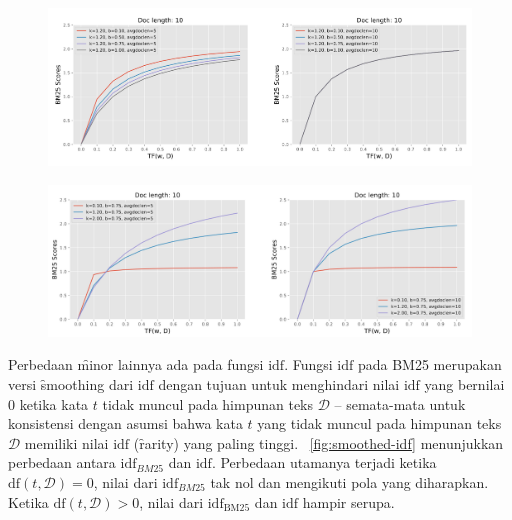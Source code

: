     \begin{figure}[!ht]
        \centering
        \includegraphics[width=1\textwidth]{assets/pics/effect-bm25-param-b.png}
        \label{fig:effect-bm25-param-b}
    \end{figure}
    \begin{figure}[!ht]
        \centering
        \includegraphics[width=1\textwidth]{assets/pics/effect-bm25-param-k.png}
        \label{fig:effect-bm25-param-k}
    \end{figure}
    
    Perbedaan \f{minor} lainnya ada pada fungsi $\text{idf}$. Fungsi $\text{idf}$ pada BM25 merupakan versi \f{smoothing} dari $\text{idf}$ dengan tujuan untuk menghindari nilai $\text{idf}$ yang bernilai 0 ketika kata $t$ tidak muncul pada himpunan teks $\mathcal{D}$ -- semata-mata untuk konsistensi dengan asumsi bahwa kata $t$ yang tidak muncul pada himpunan teks $\mathcal{D}$ memiliki nilai $\text{idf}$ (\f{rarity}) yang paling tinggi. \pic~\ref{fig:smoothed-idf} menunjukkan perbedaan antara $\text{idf}_{BM25}$ dan $\text{idf}$. Perbedaan utamanya terjadi ketika $\text{df}(t,\mathcal{D}) = 0$, nilai dari  $\text{idf}_{BM25}$ tak nol dan mengikuti pola yang diharapkan. Ketika $\text{df}(t,\mathcal{D})>0$, nilai dari $\text{idf}_{\text{BM25}}$ dan $\text{idf}$ hampir serupa.


